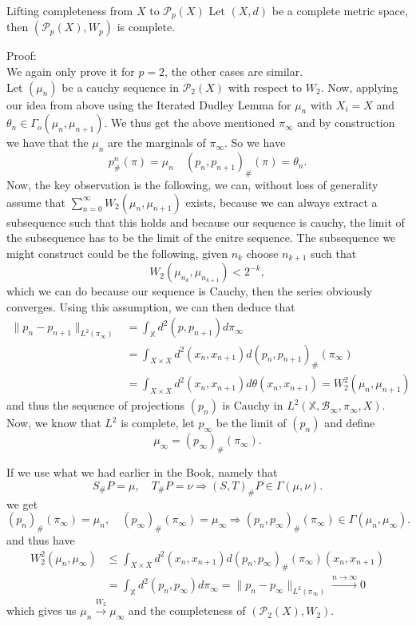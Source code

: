 \documentclass[15pt]{article}
\begin{document}
\begin{theorem}{Lifting completeness from $X$ to $\mathcal{P}_p(X)$}{}
  Let $(X,d)$ be a complete metric space, then $(\mathcal{P}_p(X), W_p)$ is complete.
\end{theorem}

Proof: 
\vspace{0.3cm} \\
We again only prove it for $p = 2$, the other cases are similar.  \\

Let $(\mu_n)$ be a cauchy sequence in $\mathcal{P}_2(X)$ with respect to $W_2$. Now, applying our idea from above using the Iterated Dudley Lemma for $\mu_n$ with $X_i = X$ and $\theta_n \in \Gamma_o(\mu_n,\mu_{n+1})$.
We thus get the above mentioned $\pi_\infty$ and by construction we have that the $\mu_n$ are the marginals of $\pi_\infty$. So we have $$p^n_{\#}(\pi) = \mu_n \quad (p_n,p_{n+1})_{\#}(\pi) = \theta_n.$$ 
Now, the key observation is the following, we can, without loss of generality assume that $\sum\limits_{n = 0}^\infty W_2(\mu_n,\mu_{n+1})$ exists, 
because we can always extract a subsequence such that this holds and because our sequence is cauchy, the limit of the subsequence has to be the limit of the enitre sequence. 
The subsequence we might construct could be the following, given $n_k$ choose $n_{k+1}$ such that $$W_2(\mu_{n_k},\mu_{n_{k+1}}) < 2^{-k},$$ 
which we can do because our sequence is Cauchy, then the series obviously converges.   
Using this assumption, we can then deduce that  
\begin{align*}\|p_n-p_{n+1}\|_{L^2(\pi_{\infty})} &= \int_\mathbb{X} d^2(p,p_{n+1}) d\pi_\infty \\ &= \int_{X \times X} d^2(x_n, x_{n+1}) d(p_n,p_{n+1})_{\#}(\pi_\infty) \\ &= \int_{X \times X} d^2(x_n,x_{n+1}) d\theta(x_n,x_{n+1}) = W_2^2(\mu_n,\mu_{n+1})\end{align*} 
and thus the sequence of projections $(p_n)$ is Cauchy in $L^2(\mathbb{X},\mathcal{B}_\infty,\pi_\infty, X)$. Now, we know that $L^2$ is complete, let $p_\infty$ be the limit of $(p_n)$ and define $$\mu_\infty = (p_\infty)_{\#}(\pi_\infty).$$

If we use what we had earlier in the Book, namely that $$S_{\#}P = \mu, \quad T_{\#}P = \nu \Rightarrow (S,T)_{\#}P \in \Gamma(\mu,\nu).$$ we get $$(p_n)_{\#}(\pi_\infty) = \mu_n, \quad (p_\infty)_{\#}(\pi_\infty) = \mu_\infty \Rightarrow (p_n,p_{\infty})_{\#}(\pi_\infty) \in \Gamma(\mu_n,\mu_\infty).$$
and thus have \begin{align*}W_2^2(\mu_n,\mu_\infty) &\leq \int_{X \times X} d^2(x_n,x_{n+1}) d(p_n,p_\infty)_{\#}(\pi_\infty)(x_n,x_{n+1}) \\ &= \int_{\mathbb{X}} d^2(p_n,p_\infty) d\pi_\infty = \|p_n-p_\infty\|_{L^2(\pi_\infty)} \xrightarrow{n \to \infty} 0\end{align*} 
which gives us $\mu_n \xrightarrow{W_2} \mu_\infty$ and the completeness of $(\mathcal{P}_2(X), W_2)$. 
\end{document}
